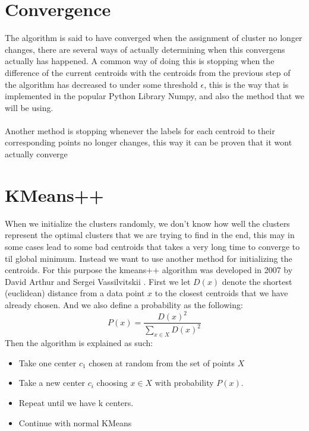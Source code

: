 \documentclass[12pt]{report}
\begin{document}
\section{Convergence}
\label{subsec:Convergens}
The algorithm is said to have converged when the assignment of cluster no longer changes, there are several ways of actually determining when this convergens actually has happened. A common way of doing this is stopping when the difference of the current centroids with the centroids from the previous step of the algorithm has decreased to under some threshold $\epsilon$, this is the way that is implemented in the popular Python Library Numpy, and also the method that we will be using. \\\\
Another method is stopping whenever the labels for each centroid to their corresponding points no longer changes, this way it can be proven that it wont actually converge



\section{KMeans++}
\label{sec:plusplus}
When we initialize the clusters randomly, we don't know how well the clusters represent the optimal clusters that we are trying to find in the end, this may in some cases lead to some  bad centroids that takes a very long time to converge to til global minimum. Instead we want to use another method for initializing the centroids. For this purpose the kmeans++ algorithm was developed in 2007 by David Arthur and Sergei Vassilvitskii \cite{plusplus}.
First we let $D(x)$ denote the shortest (euclidean) distance from a data point $x$ to the closest centroids that we have already chosen. And we also define a probability as the following:
\begin{equation}
P(x) = \frac{D(x)^2}{\sum_{x\in X}D(x)^2}
\end{equation}
Then the algorithm is explained as such:
\begin{itemize}
  \item Take one center $c_1$ chosen at random from the set of points $X$
  \item Take a new center $c_i$ choosing $x\in X$ with probability $P(x)$.
  \item Repeat until we have k centers.
  \item Continue with normal KMeans
\end{itemize}
\end{document}
